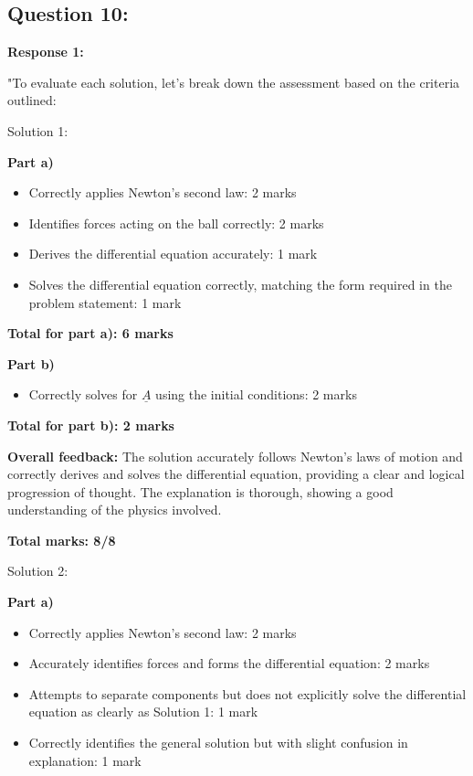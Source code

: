 \documentclass[a4paper,11pt]{article}
\begin{document}
\subsection*{Question 10:}

\textbf{Response 1:}

"To evaluate each solution, let's break down the assessment based on the criteria outlined:

Solution 1:

\textbf{Part a)}

\begin{itemize}
    \item Correctly applies Newton's second law: 2 marks
    \item Identifies forces acting on the ball correctly: 2 marks
    \item Derives the differential equation accurately: 1 mark
    \item Solves the differential equation correctly, matching the form required in the problem statement: 1 mark
\end{itemize}

\textbf{Total for part a): 6 marks}

\textbf{Part b)}

\begin{itemize}
    \item Correctly solves for \( \underline{A} \) using the initial conditions: 2 marks
\end{itemize}

\textbf{Total for part b): 2 marks}

\textbf{Overall feedback:} The solution accurately follows Newton's laws of motion and correctly derives and solves the differential equation, providing a clear and logical progression of thought. The explanation is thorough, showing a good understanding of the physics involved.

\textbf{Total marks: 8/8}

Solution 2:

\textbf{Part a)}

\begin{itemize}
    \item Correctly applies Newton's second law: 2 marks
    \item Accurately identifies forces and forms the differential equation: 2 marks
    \item Attempts to separate components but does not explicitly solve the differential equation as clearly as Solution 1: 1 mark
    \item Correctly identifies the general solution but with slight confusion in explanation: 1 mark
\end{itemize}
\end{document}
